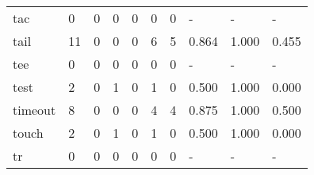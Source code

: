\begin{longtable}{lp{2.0cm}p{2.0cm}p{2.0cm}p{2.0cm}p{2.0cm}p{2.0cm}p{2.0cm}p{2.0cm}p{2.0cm}}
tac       &                      0 &                                             0 &                                            0 &                                           0 &                                            0 &                                          0 &                                    - &                                      - &                                    - \\
tail      &                     11 &                                             0 &                                            0 &                                           0 &                                            6 &                                          5 &                                0.864 &                                  1.000 &                                0.455 \\
tee       &                      0 &                                             0 &                                            0 &                                           0 &                                            0 &                                          0 &                                    - &                                      - &                                    - \\
test      &                      2 &                                             0 &                                            1 &                                           0 &                                            1 &                                          0 &                                0.500 &                                  1.000 &                                0.000 \\
timeout   &                      8 &                                             0 &                                            0 &                                           0 &                                            4 &                                          4 &                                0.875 &                                  1.000 &                                0.500 \\
touch     &                      2 &                                             0 &                                            1 &                                           0 &                                            1 &                                          0 &                                0.500 &                                  1.000 &                                0.000 \\
tr        &                      0 &                                             0 &                                            0 &                                           0 &                                            0 &                                          0 &                                    - &                                      - &                                    - \\

\end{longtable}
